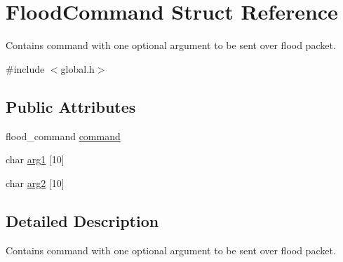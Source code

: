 \hypertarget{structFloodCommand}{\section{Flood\-Command Struct Reference}
\label{structFloodCommand}
}


Contains command with one optional argument to be sent over flood packet.  




{\ttfamily \#include $<$global.\-h$>$}

\subsection*{Public Attributes}
\begin{DoxyCompactItemize}
\item 
flood\-\_\-command \hyperlink{structFloodCommand_a44fa66244aee8f4128e1eba268bd8482}{command}
\item 
char \hyperlink{structFloodCommand_abfd3e6c3afbc29a96e44d48113e470cb}{arg1} \mbox{[}10\mbox{]}
\item 
char \hyperlink{structFloodCommand_a5b67492eac0bf5d5f2a485c249520ecb}{arg2} \mbox{[}10\mbox{]}
\end{DoxyCompactItemize}


\subsection{Detailed Description}
Contains command with one optional argument to be sent over flood packet. 

